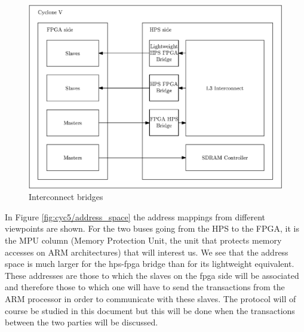 \begin{figure}[H]
    \centering
    \includegraphics[scale=0.6]{Chapter1-Hardware/res/cycv_interconnect}
    \caption{Interconnect bridges}
    \label{fig:cyc5/interconnect}
\end{figure}

In Figure \ref{fig:cyc5/address_space} the address mappings from different viewpoints are shown. For 
the two buses going from the HPS to the FPGA, it is the MPU column (Memory Protection Unit, the unit 
that protects memory accesses on ARM architectures) that will interest us. We see that the address 
space is much larger for the hps-fpga bridge than for its lightweight equivalent. These addresses 
are those to which the slaves on the fpga side will be associated and therefore those to which one
will have to send the transactions from the ARM processor in order to communicate with these slaves. 
The protocol will of course be studied in this document but this will be done when the transactions 
between the two parties will be discussed.

